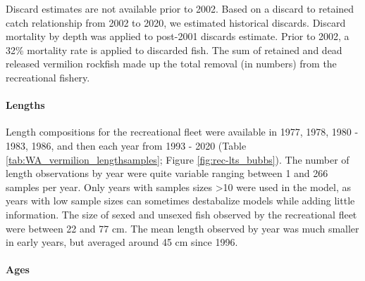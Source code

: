 \documentclass[11pt,
  english,
  a4paper,
]{article}
\begin{document}
\leavevmode\tagmcend\tagstructend\par


Discard estimates are not available prior to 2002. Based on a discard to retained catch relationship from 2002 to 2020, we estimated historical discards. Discard mortality by depth was applied to post-2001 discards estimate. Prior to 2002, a 32\% mortality rate is applied to discarded fish. The sum of retained and dead released vermilion rockfish made up the total removal (in numbers) from the recreational fishery.

\leavevmode\tagmcend\tagstructend\par


\hypertarget{lengths}{%
\paragraph{Lengths}\label{lengths}}

\leavevmode\tagmcend\tagstructend


Length compositions for the recreational fleet were available in 1977, 1978, 1980 - 1983, 1986, and then each year from 1993 - 2020 (Table \ref{tab:WA_vermilion_lengthsamples}; Figure \ref{fig:rec-lts_bubbs}). The number of length observations by year were quite variable ranging between 1 and 266 samples per year. Only years with samples sizes \textgreater10 were used in the model, as years with low sample sizes can sometimes destabalize models while adding little information. The size of sexed and unsexed fish observed by the recreational fleet were between 22 and 77 cm. The mean length observed by year was much smaller in early years, but averaged around 45 cm since 1996.

\leavevmode\tagmcend\tagstructend\par


\hypertarget{ages}{%
\paragraph{Ages}\label{ages}}

\leavevmode\tagmcend\tagstructend

\end{document}
